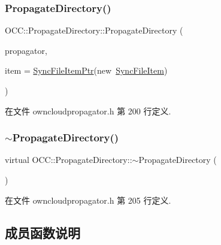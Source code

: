 \subsubsection{\texorpdfstring{Propagate\+Directory()}{PropagateDirectory()}}
{\footnotesize\ttfamily O\+C\+C\+::\+Propagate\+Directory\+::\+Propagate\+Directory (\begin{DoxyParamCaption}\item[{\hyperlink{class_o_c_c_1_1_owncloud_propagator}{Owncloud\+Propagator} $\ast$}]{propagator,  }\item[{const \hyperlink{namespace_o_c_c_acb6b0db82893659fbd0c98d3c5b8e2b8}{Sync\+File\+Item\+Ptr} \&}]{item = {\ttfamily \hyperlink{namespace_o_c_c_acb6b0db82893659fbd0c98d3c5b8e2b8}{Sync\+File\+Item\+Ptr}(new~\hyperlink{class_o_c_c_1_1_sync_file_item}{Sync\+File\+Item})} }\end{DoxyParamCaption})\hspace{0.3cm}{\ttfamily [explicit]}}



在文件 owncloudpropagator.\+h 第 200 行定义.

\mbox{\label{class_o_c_c_1_1_propagate_directory_a49b5ee6c9b180a513b43bbe9c02e9df4}} 
\subsubsection{\texorpdfstring{$\sim$\+Propagate\+Directory()}{~PropagateDirectory()}}
{\footnotesize\ttfamily virtual O\+C\+C\+::\+Propagate\+Directory\+::$\sim$\+Propagate\+Directory (\begin{DoxyParamCaption}{ }\end{DoxyParamCaption})\hspace{0.3cm}{\ttfamily [virtual]}}



在文件 owncloudpropagator.\+h 第 205 行定义.



\subsection{成员函数说明}
\mbox{\label{class_o_c_c_1_1_propagate_directory_a73fa8d31abcef1d29a1551c438f1568e}} 
